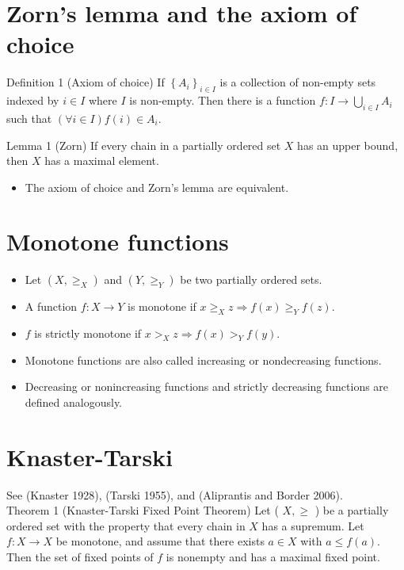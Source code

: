 \documentclass[10pt]{article}
\begin{document}
\section*{Zorn's lemma and the axiom of choice}
Definition 1 (Axiom of choice) If $\left\{A_{i}\right\}_{i \in I}$ is a collection of non-empty sets indexed by $i \in I$ where $I$ is non-empty. Then there is a function $f: I \rightarrow \bigcup_{i \in I} A_{i}$ such that $(\forall i \in I) f(i) \in A_{i}$.

Lemma 1 (Zorn) If every chain in a partially ordered set $X$ has an upper bound, then $X$ has a maximal element.

\begin{itemize}
  \item The axiom of choice and Zorn's lemma are equivalent.
\end{itemize}

\section*{Monotone functions}
\begin{itemize}
  \item Let $\left(X, \geq_{X}\right)$ and $\left(Y, \geq_{Y}\right)$ be two partially ordered sets.
  \item A function $f: X \rightarrow Y$ is monotone if $x \geq_{X} z \Longrightarrow f(x) \geq_{Y} f(z)$.
  \item $f$ is strictly monotone if $x>_{X} z \Longrightarrow f(x)>_{Y} f(y)$.
  \item Monotone functions are also called increasing or nondecreasing functions.
  \item Decreasing or nonincreasing functions and strictly decreasing functions are defined analogously.
\end{itemize}

\section*{Knaster-Tarski}
See (Knaster 1928), (Tarski 1955), and (Aliprantis and Border 2006).\\
Theorem 1 (Knaster-Tarski Fixed Point Theorem) Let ( $X, \geq$ ) be a partially ordered set with the property that every chain in $X$ has a supremum. Let $f: X \rightarrow X$ be monotone, and assume that there exists $a \in X$ with $a \leq f(a)$. Then the set of fixed points of $f$ is nonempty and has a maximal fixed point.
\end{document}
